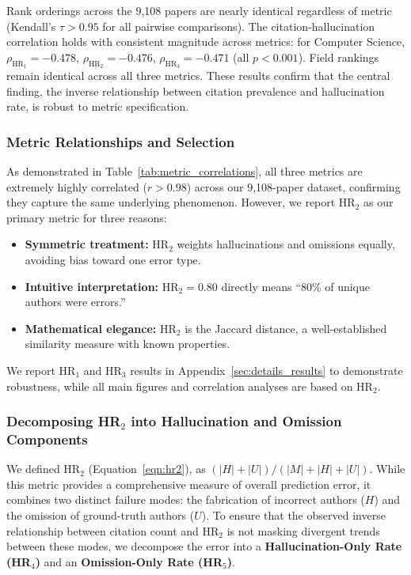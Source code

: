 \documentclass[11pt]{article}
\begin{document}
Rank orderings across the 9,108 papers are nearly identical regardless of metric (Kendall's $\tau > 0.95$ for all pairwise comparisons). The citation-hallucination correlation holds with consistent magnitude across metrics: for Computer Science, $\rho_{\text{HR}_1} = -0.478$, $\rho_{\text{HR}_2} = -0.476$, $\rho_{\text{HR}_3} = -0.471$ (all $p < 0.001$). Field rankings remain identical across all three metrics. These results confirm that the central finding, the inverse relationship between citation prevalence and hallucination rate, is robust to metric specification.

\subsubsection{Metric Relationships and Selection}

As demonstrated in Table~\ref{tab:metric_correlations}, all three metrics are extremely highly correlated ($r > 0.98$) across our 9,108-paper dataset, confirming they capture the same underlying phenomenon. However, we report HR$_2$ as our primary metric for three reasons:

\begin{itemize}[
   leftmargin=1em,
    itemsep=0.2em,
    topsep=0.2em,
    partopsep=0em,
    parsep=0em
]
\item \textbf{Symmetric treatment:} HR$_2$ weights hallucinations and omissions equally, avoiding bias toward one error type.
\item \textbf{Intuitive interpretation:} HR$_2 = 0.80$ directly means ``80\% of unique authors were errors.''
\item \textbf{Mathematical elegance:} HR$_2$ is the Jaccard distance, a well-established similarity measure with known properties.
\end{itemize}

We report HR$_1$ and HR$_3$ results in Appendix~\ref{sec:details_results} to demonstrate robustness, while all main figures and correlation analyses are based on HR$_2$.

\subsubsection{Decomposing HR\texorpdfstring{$_2$}{2} into Hallucination and Omission Components}
\label{sec:appendix_hr2_decomposition}

We defined HR$_2$ (Equation~\ref{eqn:hr2}), as $(|H|+|U|) / (|M|+|H|+|U|)$. While this metric provides a comprehensive measure of overall prediction error, it combines two distinct failure modes: the fabrication of incorrect authors ($H$) and the omission of ground-truth authors ($U$). To ensure that the observed inverse relationship between citation count and HR$_2$ is not masking divergent trends between these modes, we decompose the error into a \textbf{Hallucination-Only Rate (HR$_4$)} and an \textbf{Omission-Only Rate (HR$_5$)}.
\end{document}
